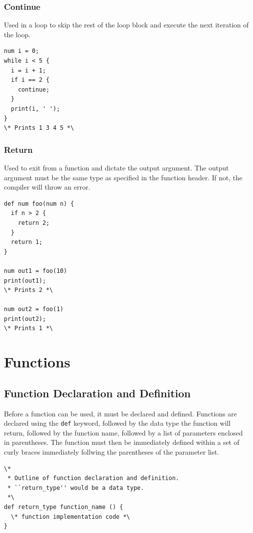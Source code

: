 \documentclass{article}
\newcommand{\code}[1]{\texttt{#1}} %
\begin{document}
\subsubsection{Continue}
Used in a loop to skip the rest of the loop block and execute the next iteration of the loop.

\begin{lstlisting}[language=pltLang, label=lst:continue-statement]
num i = 0;
while i < 5 {
  i = i + 1;
  if i == 2 {
    continue;
  }
  print(i, ' ');
}
\* Prints 1 3 4 5 *\

\end{lstlisting}

\subsubsection{Return}
Used to exit from a function and dictate the output argument. The output argument must be the same type as specified in the function header. If not, the compiler will throw an error.

\begin{lstlisting}[language=pltLang, label=lst:return-statement]
def num foo(num n) {
  if n > 2 {
    return 2;
  }
  return 1;
} 

num out1 = foo(10)
print(out1);
\* Prints 2 *\

num out2 = foo(1)
print(out2);
\* Prints 1 *\
\end{lstlisting}


\section{Functions}

\subsection{Function Declaration and Definition}

Before a function can be used, it must be declared and defined. Functions are declared using the \code{def} keyword, followed by the data type the function will return, followed by the function name, followed by a list of parameters enclosed in parentheses. The function must then be immediately defined within a set of curly braces immediately follwing the parentheses of the parameter list. 

\begin{lstlisting}[language=pltLang, caption=Function declaration and definition., label=lst:funct-def]
\* 
 * Outline of function declaration and definition.
 * ``return_type'' would be a data type.
 *\
def return_type function_name () {
  \* function implementation code *\
}
\end{lstlisting}
\end{document}
